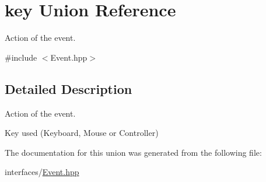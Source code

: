 \hypertarget{unionkey}{\section{key Union Reference}
\label{unionkey}
}


Action of the event.  




{\ttfamily \#include $<$Event.\-hpp$>$}



\subsection{Detailed Description}
Action of the event. 

Key used (Keyboard, Mouse or Controller) 

The documentation for this union was generated from the following file\-:\begin{DoxyCompactItemize}
\item 
interfaces/\hyperlink{interfaces_2_event_8hpp}{Event.\-hpp}\end{DoxyCompactItemize}
